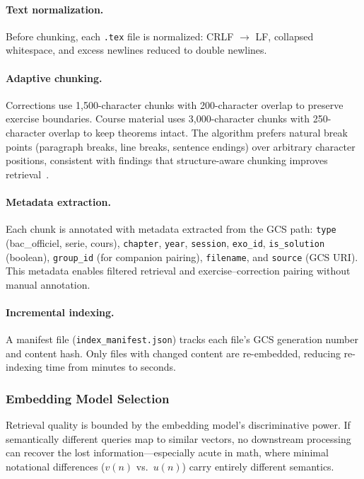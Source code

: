 \paragraph{Text normalization.}
Before chunking, each \texttt{.tex} file is normalized: CRLF $\to$ LF,
collapsed whitespace, and excess newlines reduced to double newlines.

\paragraph{Adaptive chunking.}
Corrections use 1{,}500-character chunks with 200-character overlap to
preserve exercise boundaries. Course material uses 3{,}000-character chunks
with 250-character overlap to keep theorems intact. The algorithm prefers
natural break points (paragraph breaks, line breaks, sentence endings) over
arbitrary character positions, consistent with findings that structure-aware
chunking improves retrieval~\cite{zhao2024financial_chunking, chen2024mog}.

\paragraph{Metadata extraction.}
Each chunk is annotated with metadata extracted from the GCS path:
\texttt{type} (bac\_officiel, serie, cours), \texttt{chapter},
\texttt{year}, \texttt{session}, \texttt{exo\_id}, \texttt{is\_solution}
(boolean), \texttt{group\_id} (for companion pairing), \texttt{filename},
and \texttt{source} (GCS URI). This metadata enables filtered retrieval and
exercise--correction pairing without manual annotation.

\paragraph{Incremental indexing.}
A manifest file (\texttt{index\_manifest.json}) tracks each file's GCS
generation number and content hash. Only files with changed content are
re-embedded, reducing re-indexing time from minutes to seconds.


\subsubsection{Embedding Model Selection}
\label{subsec:embedding-selection}

Retrieval quality is bounded by the embedding model's discriminative power.
If semantically different queries map to similar vectors, no downstream
processing can recover the lost information---especially acute in math,
where minimal notational differences ($v(n)$ vs.\ $u(n)$) carry entirely
different semantics.

